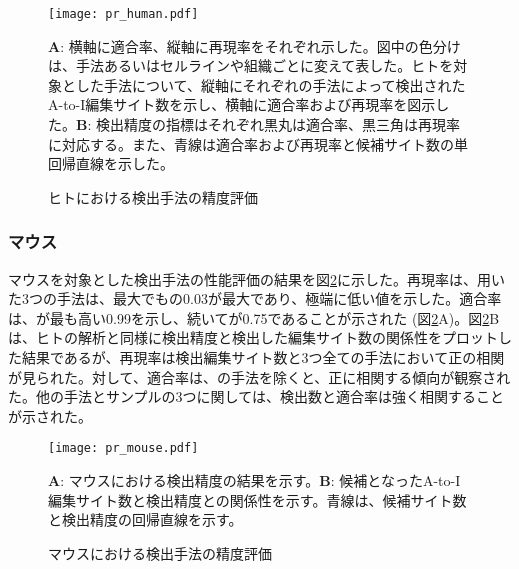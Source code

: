 \begin{figure}[!h]
	\begin{center}
		\texttt{[image: pr\_human.pdf]}
	\end{center}
	\caption{ヒトにおける検出手法の精度評価}
	\begin{flushleft}
		\small{\textbf{A}: 横軸に適合率、縦軸に再現率をそれぞれ示した。図中の色分けは、手法あるいはセルラインや組織ごとに変えて表した。ヒトを対象とした手法について、縦軸にそれぞれの手法によって検出されたA-to-I編集サイト数を示し、横軸に適合率および再現率を図示した。\textbf{B}: 検出精度の指標はそれぞれ黒丸は適合率、黒三角は再現率に対応する。また、青線は適合率および再現率と候補サイト数の単回帰直線を示した。}
	\end{flushleft}
	\label{fig:human}
\end{figure}

\subsubsection{マウス}
マウスを対象とした検出手法の性能評価の結果を図\ref{fig:mouse}に示した。再現率は、用いた3つの手法は、最大でも\cite{Gu:2012aa}の0.03が最大であり、極端に低い値を示した。適合率は、\cite{Gu:2012aa}が最も高い0.99を示し、続いて\cite{DilHauGib1304}が0.75であることが示された (図\ref{fig:mouse}A)。図\ref{fig:mouse}Bは、ヒトの解析と同様に検出精度と検出した編集サイト数の関係性をプロットした結果であるが、再現率は検出編集サイト数と3つ全ての手法において正の相関が見られた。対して、適合率は、\cite{LagHorMar1304}の手法を除くと、正に相関する傾向が観察された。他の手法とサンプルの3つに関しては、検出数と適合率は強く相関することが示された。
\begin{figure}[!h]
	\begin{center}
		\texttt{[image: pr\_mouse.pdf]}
	\end{center}
	\caption{マウスにおける検出手法の精度評価}
	\begin{flushleft}
		\small{\textbf{A}: マウスにおける検出精度の結果を示す。\textbf{B}: 候補となったA-to-I編集サイト数と検出精度との関係性を示す。青線は、候補サイト数と検出精度の回帰直線を示す。}
	\end{flushleft}
	\label{fig:mouse}
\end{figure}

